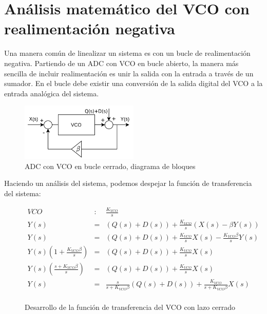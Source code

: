 \documentclass[12pt]{report} %
\begin{document}
	
	\section{Análisis matemático del VCO con realimentación negativa}
	
	Una manera común de linealizar un sistema es con un bucle de realimentación negativa. Partiendo de un ADC con VCO en bucle abierto, la manera más sencilla de incluir realimentación es unir la salida con la entrada a través de un sumador. En el bucle debe existir una conversión de la salida digital del VCO a la entrada analógica del sistema.

	\begin{figure}[H]
		\includegraphics[width=0.5\textwidth]{vco-diagram-closed-loop-with-D.png}
		\caption[ADC con VCO en bucle abierto, diagrama de bloques]{ADC con VCO en bucle cerrado, diagrama de bloques}
		\label{fig:vco-diagram-closed-loop-with-D.png}
	\end{figure}
	
	Haciendo un análisis del sistema, podemos despejar la función de transferencia del sistema:
	
	\begin{figure}[H]
		\caption{Desarrollo de la función de transferencia del VCO con lazo cerrado}
		\label{vco-closed-loop-s}
		\begin{equation}
		\begin{array}{lcl}
		VCO & : & \frac{K_{VCO}}{s} \\
		Y(s) &=& ( Q(s) + D(s) ) + \frac{K_{VCO}}{s}(X(s) - \beta Y(s) ) \\
		Y(s) &=& ( Q(s) + D(s) ) + \frac{K_{VCO}}{s}X(s) - \frac{K_{VCO} \beta}{s}Y(s) \\
		Y(s) (1 + \frac{K_{VCO}\beta}{s}) &=& ( Q(s) + D(s) ) + \frac{K_{VCO}}{s}X(s) \\
		Y(s) (\frac{s + K_{VCO}\beta}{s}) &=& ( Q(s) + D(s) ) + \frac{K_{VCO}}{s}X(s) \\
		Y(s) &=& \frac{s}{s + K_{VCO}\beta}( Q(s) + D(s) ) + \frac{K_{VCO}}{s + K_{VCO}\beta}X(s) \\
		\end{array}
		\end{equation}
	\end{figure}
	
\end{document}
